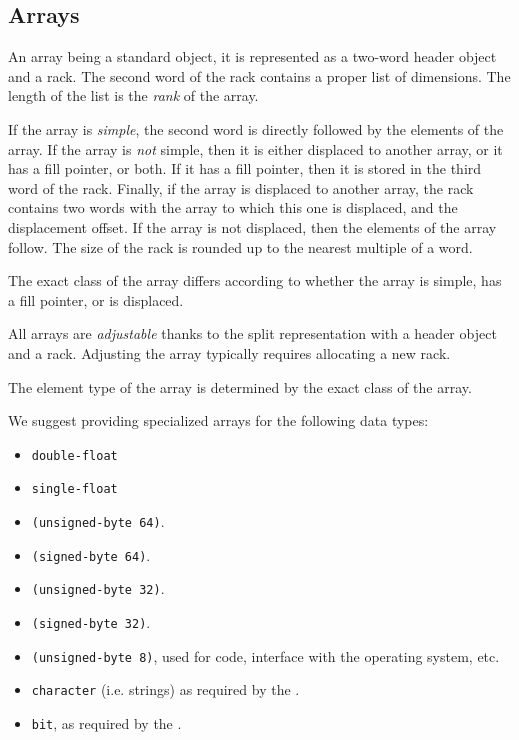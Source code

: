 \subsection{Arrays}
\label{sec-data-representation-arrays}

An array being a standard object, it is represented as a two-word
header object and a rack.  The second word of the rack
contains a proper list of dimensions.  The length of the list
is the \emph{rank} of the array.

If the array is \emph{simple}, the second word is directly followed
by the elements of the array.  If the array is \emph{not} simple, then
it is either displaced to another array, or it has a fill pointer, or
both.  If it has a fill pointer, then it is stored in the third word
of the rack.  Finally, if the array is displaced to another
array, the rack contains two words with the array to which
this one is displaced, and the displacement offset.  If the array is
not displaced, then the elements of the array follow.  The size of the
rack is rounded up to the nearest multiple of a word.

The exact class of the array differs according to whether the array is
simple, has a fill pointer, or is displaced.

All arrays are \emph{adjustable} thanks to the split representation
with a header object and a rack.  Adjusting the array
typically requires allocating a new rack.

The element type of the array is determined by the exact class of the
array.

We suggest providing specialized arrays for the following data types:

\begin{itemize}
\item \texttt{double-float}
\item \texttt{single-float}
\item \texttt{(unsigned-byte 64)}.
\item \texttt{(signed-byte 64)}.
\item \texttt{(unsigned-byte 32)}.
\item \texttt{(signed-byte 32)}.
\item \texttt{(unsigned-byte 8)}, used for code, interface with the
  operating system, etc.
\item \texttt{character} (i.e. strings) as required by the \hs{}.
\item \texttt{bit}, as required by the \hs{}.
\end{itemize}

